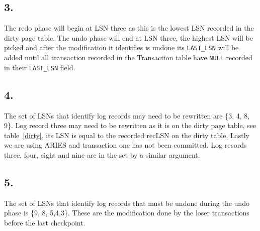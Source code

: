 \documentclass[12pt]{article}
\begin{document}
\subsection*{3.}
The redo phase will begin at LSN three as this is the lowest LSN recorded in the dirty page table. The undo phase will end at LSN three, the highest LSN will be picked and after the modification it identifies is undone its \texttt{LAST\_LSN} will be added until all transaction recorded in the Transaction table have \texttt{NULL} recorded in their \texttt{LAST\_LSN} field.
\subsection*{4.}
The set of LSNs that identify log records may need to be rewritten are \{3, 4, 8, 9\}. Log record three may need to be rewritten as it is on the dirty page table, see table~\ref{dirty}, its LSN is equal to the recorded recLSN on the dirty table. Lastly we are using ARIES and transaction one has not been committed. Log records three, four, eight and nine are in the set by a similar argument.
\subsection*{5.}
The set of LSNs that identify log records that must be undone during the undo phase is \{9, 8, 5,4,3\}. These are the modification done by the loser transactions before the last checkpoint.
\end{document}
